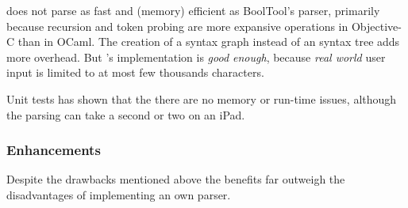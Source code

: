 \Nyaya does not parse as fast and (memory) efficient as BoolTool's parser,
primarily because recursion and token probing are more expansive operations in Objective-C than in OCaml.
The creation of a syntax graph instead of an syntax tree adds more overhead.
But \Nyaya's implementation is {\em good enough}, 
because {\em real world} user input is limited to at most few thousands characters.

Unit tests has shown that the there are no memory or run-time issues, 
although the parsing can take a second or two on an iPad.

\subsubsection{Enhancements}

Despite the drawbacks mentioned above
the benefits far outweigh the disadvantages of implementing an own parser.

